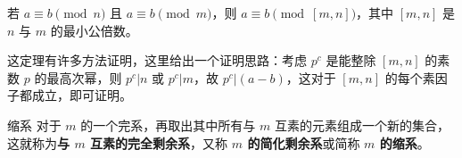 \begin{theorem}{}
若 $a \equiv b \pmod n$ 且 $a \equiv b \pmod m$，则 $a \equiv b \pmod{[m, n]}$，其中 $[m, n]$ 是 $n$ 与 $m$ 的最小公倍数。
\end{theorem}
这定理有许多方法证明，这里给出一个证明思路：考虑 $p^c$ 是能整除 $[m, n]$ 的素数 $p$ 的最高次幂，则 $p^c | n$ 或 $p^c | m$，故 $p^c | (a - b)$，这对于 $[m, n]$ 的每个素因子都成立，即可证明。

\begin{definition}{缩系}
对于 $m$ 的一个完系，再取出其中所有与 $m$ 互素的元素组成一个新的集合，这就称为\textbf{与 $m$ 互素的完全剩余系}，又称\textbf{ $m$ 的简化剩余系}或简称 \textbf{$m$ 的缩系}。
\end{definition}
